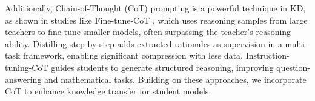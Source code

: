 Additionally, Chain-of-Thought (CoT) prompting is a powerful technique in KD, as shown in studies like Fine-tune-CoT \cite{ho2022large}, which uses reasoning samples from large teachers to fine-tune smaller models, often surpassing the teacher's reasoning ability. Distilling step-by-step \cite{hsieh2023distilling} adds extracted rationales as supervision in a multi-task framework, enabling significant compression with less data. Instruction-tuning-CoT \cite{ranaldi2024aligning} guides students to generate structured reasoning, improving question-answering and mathematical tasks. Building on these approaches, we incorporate CoT to enhance knowledge transfer for student models.
